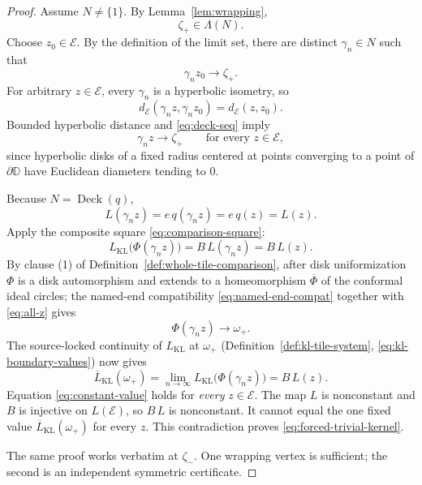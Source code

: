 \begin{proof}
Assume \(N\ne\{1\}\).  By Lemma~\ref{lem:wrapping},
\[
\zeta_+\in\Lambda(N).
\]
Choose \(z_0\in\mathcal E\).  By the definition of the limit set, there are distinct \(\gamma_n\in N\) such that
\begin{equation}\label{eq:deck-seq}
\gamma_nz_0\longrightarrow\zeta_+.
\end{equation}
For arbitrary \(z\in\mathcal E\), every \(\gamma_n\) is a hyperbolic isometry, so
\begin{equation}\label{eq:isometry}
d_{\mathcal E}(\gamma_nz,\gamma_nz_0)=d_{\mathcal E}(z,z_0).
\end{equation}
Bounded hyperbolic distance and \eqref{eq:deck-seq} imply
\begin{equation}\label{eq:all-z}
\gamma_nz\longrightarrow\zeta_+\qquad\text{for every }z\in\mathcal E,
\end{equation}
since hyperbolic disks of a fixed radius centered at points converging to a point of \(\partial\mathbb D\) have Euclidean diameters tending to \(0\).

Because \(N=\operatorname{Deck}(q)\),
\begin{equation}\label{eq:deck-invariance}
L(\gamma_nz)=e\,q(\gamma_nz)=e\,q(z)=L(z).
\end{equation}
Apply the composite square \eqref{eq:comparison-square}:
\begin{equation}\label{eq:square-applied}
L_{\mathrm{KL}}\bigl(\Phi(\gamma_nz)\bigr)=B\,L(\gamma_nz)=B\,L(z).
\end{equation}
By clause (1) of Definition~\ref{def:whole-tile-comparison}, after disk uniformization \(\Phi\) is a disk automorphism and extends to a homeomorphism \(\overline\Phi\) of the conformal ideal circles; the named-end compatibility \eqref{eq:named-end-compat} together with \eqref{eq:all-z} gives
\begin{equation}\label{eq:phi-limit}
\Phi(\gamma_nz)\longrightarrow\omega_+.
\end{equation}
The source-locked continuity of \(L_{\mathrm{KL}}\) at \(\omega_+\) (Definition~\ref{def:kl-tile-system}, \eqref{eq:kl-boundary-values}) now gives
\begin{equation}\label{eq:constant-value}
\overline L_{\mathrm{KL}}(\omega_+)=\lim_{n\to\infty}L_{\mathrm{KL}}\bigl(\Phi(\gamma_nz)\bigr)=B\,L(z).
\end{equation}
Equation \eqref{eq:constant-value} holds for \emph{every} \(z\in\mathcal E\).  The map \(L\) is nonconstant and \(B\) is injective on \(L(\mathcal E)\), so \(B\,L\) is nonconstant.  It cannot equal the one fixed value \(\overline L_{\mathrm{KL}}(\omega_+)\) for every \(z\).  This contradiction proves \eqref{eq:forced-trivial-kernel}.

The same proof works verbatim at \(\zeta_-\).  One wrapping vertex is sufficient; the second is an independent symmetric certificate.
\end{proof}
